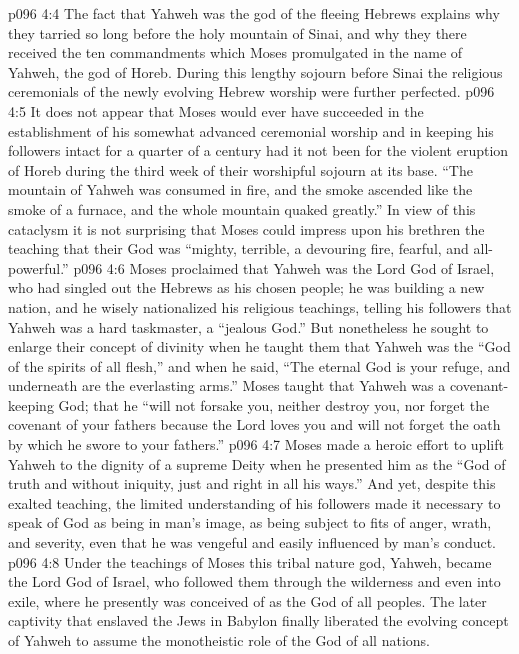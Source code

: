 \vs p096 4:4 \pc The fact that Yahweh was the god of the fleeing Hebrews explains why they tarried so long before the holy mountain of Sinai, and why they there received the ten commandments which Moses promulgated in the name of Yahweh, the god of Horeb. During this lengthy sojourn before Sinai the religious ceremonials of the newly evolving Hebrew worship were further perfected.
\vs p096 4:5 \pc It does not appear that Moses would ever have succeeded in the establishment of his somewhat advanced ceremonial worship and in keeping his followers intact for a quarter of a century had it not been for the violent eruption of Horeb during the third week of their worshipful sojourn at its base. “The mountain of Yahweh was consumed in fire, and the smoke ascended like the smoke of a furnace, and the whole mountain quaked greatly.” In view of this cataclysm it is not surprising that Moses could impress upon his brethren the teaching that their God was “mighty, terrible, a devouring fire, fearful, and all\hyp{}powerful.”
\vs p096 4:6 Moses proclaimed that Yahweh was the Lord God of Israel, who had singled out the Hebrews as his chosen people; he was building a new nation, and he wisely nationalized his religious teachings, telling his followers that Yahweh was a hard taskmaster, a “jealous God.” But nonetheless he sought to enlarge their concept of divinity when he taught them that Yahweh was the “God of the spirits of all flesh,” and when he said, “The eternal God is your refuge, and underneath are the everlasting arms.” Moses taught that Yahweh was a covenant\hyp{}keeping God; that he “will not forsake you, neither destroy you, nor forget the covenant of your fathers because the Lord loves you and will not forget the oath by which he swore to your fathers.”
\vs p096 4:7 Moses made a heroic effort to uplift Yahweh to the dignity of a supreme Deity when he presented him as the “God of truth and without iniquity, just and right in all his ways.” And yet, despite this exalted teaching, the limited understanding of his followers made it necessary to speak of God as being in man’s image, as being subject to fits of anger, wrath, and severity, even that he was vengeful and easily influenced by man’s conduct.
\vs p096 4:8 Under the teachings of Moses this tribal nature god, Yahweh, became the Lord God of Israel, who followed them through the wilderness and even into exile, where he presently was conceived of as the God of all peoples. The later captivity that enslaved the Jews in Babylon finally liberated the evolving concept of Yahweh to assume the monotheistic role of the God of all nations.
